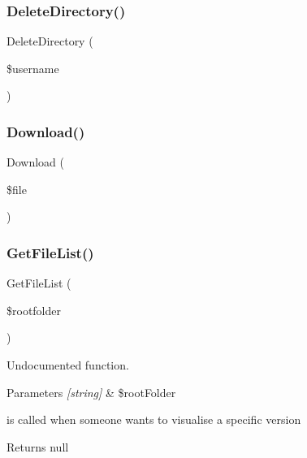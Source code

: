 \subsubsection{\texorpdfstring{Delete\+Directory()}{DeleteDirectory()}}
{\footnotesize\ttfamily Delete\+Directory (\begin{DoxyParamCaption}\item[{}]{\$username }\end{DoxyParamCaption})}

\mbox{\label{class_f_t_p_handler_ac7580ca2ea33044a1be93305918cd97e}} 
\subsubsection{\texorpdfstring{Download()}{Download()}}
{\footnotesize\ttfamily Download (\begin{DoxyParamCaption}\item[{}]{\$file }\end{DoxyParamCaption})}

\mbox{\label{class_f_t_p_handler_a6d3bfc8bc6b10bee4f850ac6ffb631dd}} 
\subsubsection{\texorpdfstring{Get\+File\+List()}{GetFileList()}}
{\footnotesize\ttfamily Get\+File\+List (\begin{DoxyParamCaption}\item[{}]{\$rootfolder }\end{DoxyParamCaption})}



Undocumented function. 


\begin{DoxyParams}{Parameters}
{\em \mbox{[}string\mbox{]}} & \$root\+Folder\\
\hline
\end{DoxyParams}
is called when someone wants to visualise a specific version \begin{DoxyReturn}{Returns}
null 
\end{DoxyReturn}
\mbox{\label{class_f_t_p_handler_ae9c342082e22d788de7b94b34b2e40d1}} 
